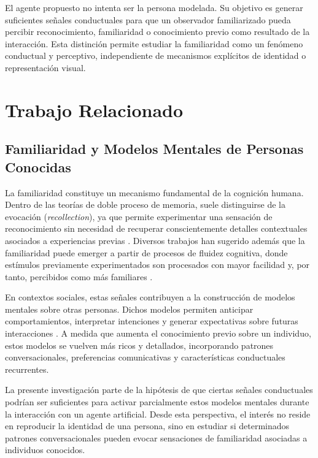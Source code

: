 \documentclass[sigconf, nonacm, language=spanish]{acmart}
\begin{document}
El agente propuesto no intenta ser la persona modelada. Su objetivo es generar suficientes señales conductuales para que un observador familiarizado pueda percibir reconocimiento, familiaridad o conocimiento previo como resultado de la interacción. Esta distinción permite estudiar la familiaridad como un fenómeno conductual y perceptivo, independiente de mecanismos explícitos de identidad o representación visual.


\section{Trabajo Relacionado}

\subsection{Familiaridad y Modelos Mentales de Personas Conocidas}

La familiaridad constituye un mecanismo fundamental de la cognición humana. Dentro de las teorías de doble proceso de memoria, suele distinguirse de la evocación (\textit{recollection}), ya que permite experimentar una sensación de reconocimiento sin necesidad de recuperar conscientemente detalles contextuales asociados a experiencias previas \cite{mickes_recollection_2009}. Diversos trabajos han sugerido además que la familiaridad puede emerger a partir de procesos de fluidez cognitiva, donde estímulos previamente experimentados son procesados con mayor facilidad y, por tanto, percibidos como más familiares \cite{kelley_subjective_1998, mecklinger_fluency_2020}.

En contextos sociales, estas señales contribuyen a la construcción de modelos mentales sobre otras personas. Dichos modelos permiten anticipar comportamientos, interpretar intenciones y generar expectativas sobre futuras interacciones \cite{tamir_predicting_2024}. A medida que aumenta el conocimiento previo sobre un individuo, estos modelos se vuelven más ricos y detallados, incorporando patrones conversacionales, preferencias comunicativas y características conductuales recurrentes.

La presente investigación parte de la hipótesis de que ciertas señales conductuales podrían ser suficientes para activar parcialmente estos modelos mentales durante la interacción con un agente artificial. Desde esta perspectiva, el interés no reside en reproducir la identidad de una persona, sino en estudiar si determinados patrones conversacionales pueden evocar sensaciones de familiaridad asociadas a individuos conocidos.
\end{document}
